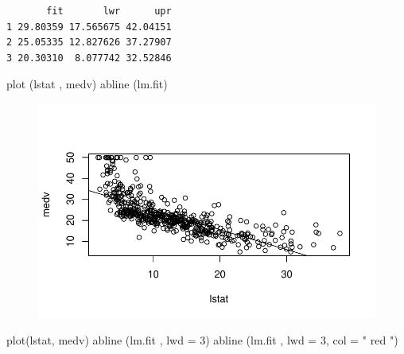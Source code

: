 \documentclass[
  letterpaper,
  DIV=11,
  numbers=noendperiod]{scrartcl}
\newenvironment{Shaded}{\begin{snugshade}}{\end{snugshade}}
\newcommand{\AttributeTok}[1]{\textcolor[rgb]{0.40,0.45,0.13}{#1}}
\newcommand{\DecValTok}[1]{\textcolor[rgb]{0.68,0.00,0.00}{#1}}
\newcommand{\FunctionTok}[1]{\textcolor[rgb]{0.28,0.35,0.67}{#1}}
\newcommand{\NormalTok}[1]{\textcolor[rgb]{0.00,0.23,0.31}{#1}}
\newcommand{\StringTok}[1]{\textcolor[rgb]{0.13,0.47,0.30}{#1}}
\begin{document}
\begin{verbatim}
       fit       lwr      upr
1 29.80359 17.565675 42.04151
2 25.05335 12.827626 37.27907
3 20.30310  8.077742 32.52846
\end{verbatim}

\begin{Shaded}
\begin{Highlighting}[]
\FunctionTok{plot}\NormalTok{ (lstat , medv)}
\FunctionTok{abline}\NormalTok{ (lm.fit)}
\end{Highlighting}
\end{Shaded}

\begin{figure}[H]

{\centering \includegraphics{Regresion-lineal-simple-y-multiple_files/figure-pdf/unnamed-chunk-11-1.pdf}

}

\end{figure}

\begin{Shaded}
\begin{Highlighting}[]
\FunctionTok{plot}\NormalTok{(lstat, medv)}
\FunctionTok{abline}\NormalTok{ (lm.fit , }\AttributeTok{lwd =} \DecValTok{3}\NormalTok{)}
\FunctionTok{abline}\NormalTok{ (lm.fit , }\AttributeTok{lwd =} \DecValTok{3}\NormalTok{, }\AttributeTok{col =} \StringTok{" red "}\NormalTok{)}
\end{Highlighting}
\end{Shaded}
\end{document}
